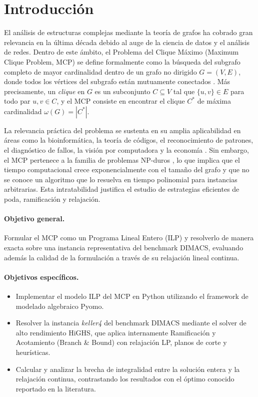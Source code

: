 \section{Introducción}

El análisis de estructuras complejas mediante la teoría de grafos ha cobrado gran relevancia en la última década debido al auge de la ciencia de datos y el análisis de redes. Dentro de este ámbito, el Problema del Clique Máximo (Maximum Clique Problem, MCP) se define formalmente como la búsqueda del subgrafo completo de mayor cardinalidad dentro de un grafo no dirigido $G = (V, E)$, donde todos los vértices del subgrafo están mutuamente conectados \parencite{pardalos1994maximum}. Más precisamente, un \emph{clique} en $G$ es un subconjunto $C \subseteq V$ tal que $\{u,v\} \in E$ para todo par $u, v \in C$, y el MCP consiste en encontrar el clique $C^*$ de máxima cardinalidad $\omega(G) = |C^*|$.

La relevancia práctica del problema se sustenta en su amplia aplicabilidad en áreas como la bioinformática, la teoría de códigos, el reconocimiento de patrones, el diagnóstico de fallos, la visión por computadora y la economía \parencite{singh2014_simple, pardalos1994maximum}. Sin embargo, el MCP pertenece a la familia de problemas NP-duros \parencite{bomze1999, pardalos1994maximum}, lo que implica que el tiempo computacional crece exponencialmente con el tamaño del grafo y que no se conoce un algoritmo que lo resuelva en tiempo polinomial para instancias arbitrarias. Esta intratabilidad justifica el estudio de estrategias eficientes de poda, ramificación y relajación.

\paragraph{Objetivo general.} Formular el MCP como un Programa Lineal Entero (ILP) y resolverlo de manera exacta sobre una instancia representativa del benchmark DIMACS, evaluando además la calidad de la formulación a través de su relajación lineal continua.

\paragraph{Objetivos específicos.}
\begin{itemize}
    \item Implementar el modelo ILP del MCP en Python utilizando el framework de modelado algebraico Pyomo.
    \item Resolver la instancia \textit{keller4} del benchmark DIMACS mediante el solver de alto rendimiento HiGHS, que aplica internamente Ramificación y Acotamiento (Branch \& Bound) con relajación LP, planos de corte y heurísticas.
    \item Calcular y analizar la brecha de integralidad entre la solución entera y la relajación continua, contrastando los resultados con el óptimo conocido reportado en la literatura.
\end{itemize}

